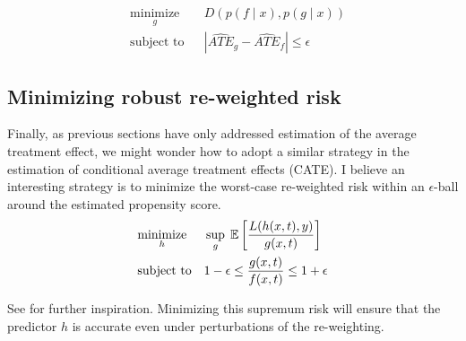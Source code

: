 \begin{equation*}
\begin{aligned}
& \underset{g}{\text{minimize}}
& & D(p(f\mid x), p(g \mid x)) \\
& \text{subject to}
& & |\hat{ATE}_{g}- \hat{ATE}_f| \leq \epsilon
\end{aligned}
\end{equation*}

\subsection{Minimizing robust re-weighted risk}
Finally, as previous sections have only addressed estimation of the average treatment effect, we might wonder how to adopt a similar strategy in the estimation of conditional average treatment effects (CATE). I believe an interesting strategy is to minimize the worst-case re-weighted risk within an $\epsilon$-ball around the estimated propensity score.
\begin{equation*}
\begin{aligned}
& \underset{h}{\text{minimize}}
& & \sup_{g}\; \mathbb{E}\left[\frac{L(h(x,t), y)}{g(x, t)} \right] \\
& \text{subject to}
& & 1-\epsilon \leq \frac{g(x, t)}{f(x, t)} \leq 1+\epsilon
\end{aligned}
\end{equation*}

See \citep{namkoong2017variance} for further inspiration. Minimizing this supremum risk will ensure that the predictor $h$ is accurate even under perturbations of the re-weighting.
